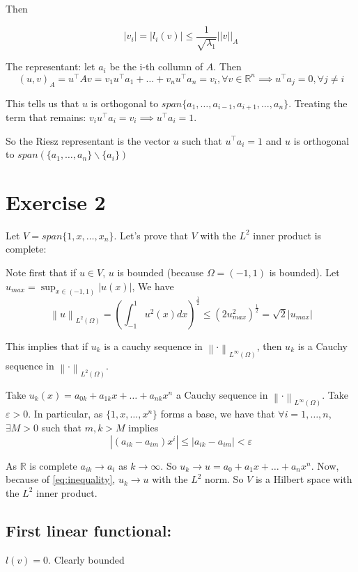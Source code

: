 \documentclass{article}
\newcommand{\normL}[2]{\left\lVert#1\right\rVert_{L^{#2}(\Omega)}}
\begin{document}
    Then

    \[
        |v_i| = |l_i(v)| \le \frac{1}{\sqrt{\lambda_1}}||v||_A 
    \]

    The representant: let $a_i$ be the i-th collumn of $A$. Then
    \[
        (u,v)_A = u^\top A v = v_1 u^\top a_1 + \dots + v_n u^\top a_n = v_i, \forall v \in \mathbb{R}^n \implies u^\top a_j = 0, \forall j \ne i
    \]

    This tells us that $u$ is orthogonal to $span\{ a_1, \dots, a_{i-1}, a_{i+1}, \dots, a_n \}$. Treating the term that remains: $v_iu^\top a_i = v_i \implies u^\top a_i = 1$.

    So the Riesz representant is the vector $u$ such that $u^\top a_i = 1$ and $u$ is orthogonal to $span(\{a_1, \dots, a_n\} \backslash \{a_i\})$

    \section*{Exercise 2}

    Let $V = span\{ 1, x, \dots, x_n \}$. Let's prove that $V$ with the $L^2$ inner product is complete:

    Note first that if $u \in V$, $u$ is bounded (because $\Omega = (-1,1)$ is bounded). Let $u_{max} = \sup_{x\in (-1,1)} |u(x)|$, We have
    \begin{equation}
        \label{eq:inequality}
        \normL{u}{2} = \left( \int_{-1}^{1} u^2(x) dx \right)^{\frac{1}{2}} \le (2 u_{max}^2)^{\frac{1}{2}} = \sqrt{2}|u_{max}|
    \end{equation}

    This implies that if $u_k$ is a cauchy sequence in $\normL{\cdot}{\infty}$, then $u_k$ is a Cauchy sequence in $\normL{\cdot}{2}$.

    Take $u_k(x) = a_{0k} + a_{1k}x + \dots + a_{nk}x^n$ a Cauchy sequence in $\normL{\cdot}{\infty}$. Take $\varepsilon > 0$. In particular, as $\{ 1, x, \dots, x^n \}$ forms a base, we have that $\forall i = 1, \dots, n$, $\exists M > 0$ such that $m,k > M$ implies
    \[
        |(a_{ik} - a_{im})x^i| \le |a_{ik} - a_{im}| < \varepsilon
    \]

    As $\mathbb{R}$ is complete $a_{ik} \to a_i$ as $k \to \infty$. So $u_k \to u = a_0 + a_1 x + \dots + a_n x^n$. Now, because of \ref{eq:inequality}, $u_k \to u$ with the $L^2$ norm. So $V$ is a Hilbert space with the $L^2$ inner product.

    \subsection*{First linear functional:} 
    $l(v) = 0$. Clearly bounded
\end{document}

